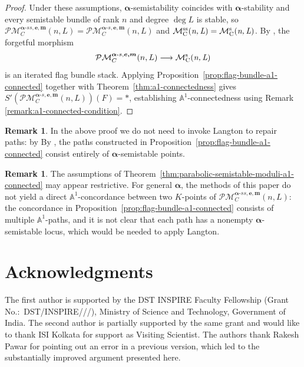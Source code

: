 \documentclass[12pt,reqno]{amsart}
\DeclareMathOperator{\mnlss}{\mc{M}^{ss}_C(\textit{n,\,L})}
\DeclareMathOperator{\mnls}{\mc{M}^{s}_C(\textit{n,\,L})}
\newcommand{\mc}[1]{\mathcal{#1}}
\newcommand{\bb}[1]{\mathbb{#1}}
\theoremstyle{definition}
\newtheorem{remark}[theorem]{Remark}
\numberwithin{equation}{section}
\begin{document}
	\begin{proof}
		Under these assumptions, $\boldsymbol{\alpha}$-semistability coincides with
		$\boldsymbol{\alpha}$-stability and every semistable bundle of rank $n$ and
		degree $\deg L$ is stable, so
		$\mc{PM}^{\boldsymbol{\alpha}\text{-}ss,\boldsymbol{e,m}}_C(n,L) =
		\mc{PM}^{\boldsymbol{\alpha}\text{-}s,\boldsymbol{e,m}}_C(n,L)$ and
		$\mnlss = \mnls$. By \cite[Proposition 5.3]{BY99}, the forgetful morphism
		\[
		\mc{PM}^{\boldsymbol{\alpha}\text{-}s,\boldsymbol{e,m}}_C(n,L)
		\longrightarrow \mnls
		\]
		is an iterated flag bundle stack. Applying
		Proposition~\ref{prop:flag-bundle-a1-connected} together with
		Theorem~\ref{thm:a1-connectedness} gives
		$S'(\mc{PM}^{\boldsymbol{\alpha}\text{-}s,\boldsymbol{e,m}}_C(n,L))(F) = *$,
		establishing $\bb{A}^1$-connectedness using Remark \ref{remark:a1-connected-condition}.
	\end{proof}
	
	\begin{remark}
		In the above proof we do not need to invoke Langton to repair paths: by
		By \cite[Proposition 5.3]{BY99}, the paths constructed in
		Proposition~\ref{prop:flag-bundle-a1-connected} consist entirely of
		$\boldsymbol{\alpha}$-semistable points.
	\end{remark}
	
	\begin{remark}
		The assumptions of Theorem~\ref{thm:parabolic-semistable-moduli-a1-connected}
		may appear restrictive. For general $\boldsymbol{\alpha}$, the methods of
		this paper do not yield a direct $\bb{A}^1$-concordance between two
		$K$-points of
		$\mc{PM}^{\boldsymbol{\alpha}\text{-}ss,\boldsymbol{e,m}}_C(n,L)$: the
		concordance in Proposition~\ref{prop:flag-bundle-a1-connected} consists of
		multiple $\bb{A}^1$-paths, and it is not clear that each path has a nonempty
		$\boldsymbol{\alpha}$-semistable locus, which would be needed to apply
		Langton.
	\end{remark}
	
	\section*{Acknowledgments}
	
	The first author is supported by the DST INSPIRE Faculty Fellowship (Grant
	No.:~DST/\allowbreak INSPIRE///),
	Ministry of Science and Technology, Government of India. The second author
	is partially supported by the same grant and would like to thank ISI Kolkata
	for support as Visiting Scientist. The authors thank Rakesh Pawar for
	pointing out an error in a previous version, which led to the substantially
	improved argument presented here.
	
\end{document}

